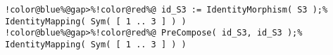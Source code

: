\begin{Verbatim}[commandchars=!@\%,frame=single]
!color@blue%@gap>%!color@red%@ id_S3 := IdentityMorphism( S3 );%
IdentityMapping( Sym( [ 1 .. 3 ] ) )
!color@blue%@gap>%!color@red%@ PreCompose( id_S3, id_S3 );%
IdentityMapping( Sym( [ 1 .. 3 ] ) )
\end{Verbatim}

